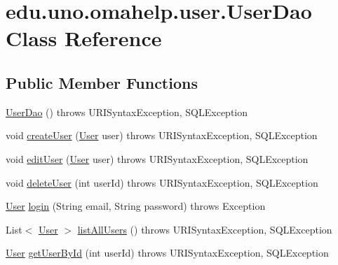 \hypertarget{classedu_1_1uno_1_1omahelp_1_1user_1_1_user_dao}{}\section{edu.\+uno.\+omahelp.\+user.\+User\+Dao Class Reference}
\label{classedu_1_1uno_1_1omahelp_1_1user_1_1_user_dao}
\subsection*{Public Member Functions}
\begin{DoxyCompactItemize}
\item 
\mbox{\hyperlink{classedu_1_1uno_1_1omahelp_1_1user_1_1_user_dao_a87fc1cbb3764e8b8acbc91c3eb444a68}{User\+Dao}} ()  throws U\+R\+I\+Syntax\+Exception, S\+Q\+L\+Exception 
\item 
void \mbox{\hyperlink{classedu_1_1uno_1_1omahelp_1_1user_1_1_user_dao_afb3c006e0b56953e04d238c8ecb97327}{create\+User}} (\mbox{\hyperlink{classedu_1_1uno_1_1omahelp_1_1user_1_1_user}{User}} user)  throws U\+R\+I\+Syntax\+Exception, S\+Q\+L\+Exception 
\item 
void \mbox{\hyperlink{classedu_1_1uno_1_1omahelp_1_1user_1_1_user_dao_ab2d6cc45a7bab0cbbadffd0c3699bf87}{edit\+User}} (\mbox{\hyperlink{classedu_1_1uno_1_1omahelp_1_1user_1_1_user}{User}} user)  throws U\+R\+I\+Syntax\+Exception, S\+Q\+L\+Exception 
\item 
void \mbox{\hyperlink{classedu_1_1uno_1_1omahelp_1_1user_1_1_user_dao_a08e1d450c641c11a55063e0b410ef9fc}{delete\+User}} (int user\+Id)  throws U\+R\+I\+Syntax\+Exception, S\+Q\+L\+Exception 
\item 
\mbox{\hyperlink{classedu_1_1uno_1_1omahelp_1_1user_1_1_user}{User}} \mbox{\hyperlink{classedu_1_1uno_1_1omahelp_1_1user_1_1_user_dao_a66bf501693e31a1e66f80a8c0c8f656f}{login}} (String email, String password)  throws Exception 
\item 
List$<$ \mbox{\hyperlink{classedu_1_1uno_1_1omahelp_1_1user_1_1_user}{User}} $>$ \mbox{\hyperlink{classedu_1_1uno_1_1omahelp_1_1user_1_1_user_dao_a24ba56ded70623975572ae502ea067c2}{list\+All\+Users}} ()  throws U\+R\+I\+Syntax\+Exception, S\+Q\+L\+Exception 
\item 
\mbox{\hyperlink{classedu_1_1uno_1_1omahelp_1_1user_1_1_user}{User}} \mbox{\hyperlink{classedu_1_1uno_1_1omahelp_1_1user_1_1_user_dao_a33a0a42ff20e467cd03825176739c1ed}{get\+User\+By\+Id}} (int user\+Id)  throws U\+R\+I\+Syntax\+Exception, S\+Q\+L\+Exception 
\end{DoxyCompactItemize}


